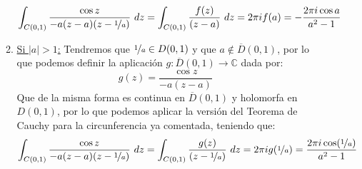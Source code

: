 \begin{ejercicio}
\begin{enumerate}
\begin{description}
\begin{enumerate}
\begin{equation*}
                            \int_{C(0,1)} \dfrac{\cos z}{-a(z-a)(z-\nicefrac{1}{a})}~dz = \int_{C(0,1)} \dfrac{f(z)}{(z-a)}~dz = 2\pi i f(a) = -\dfrac{2\pi i \cos a}{a^2-1}
                        \end{equation*}
                    \item \underline{Si $|a|>1$:} Tendremos que $\nicefrac{1}{a}\in D(0,1)$ y que $a\notin \overline{D}(0,1)$, por lo que podemos definir la aplicación $g:\overline{D}(0,1)\to \mathbb{C}$ dada por:
                        \begin{equation*}
                            g(z) = \dfrac{\cos z}{-a(z-a)}
                        \end{equation*}
                        Que de la misma forma es continua en $\overline{D}(0,1)$ y holomorfa en $D(0,1)$, por lo que podemos aplicar la versión del Teorema de Cauchy para la circunferencia ya comentada, teniendo que:
                        \begin{equation*}
                            \int_{C(0,1)} \dfrac{\cos z}{-a(z-a)(z-\nicefrac{1}{a})}~dz = \int_{C(0,1)} \dfrac{g(z)}{(z-\nicefrac{1}{a})}~dz = 2\pi i g(\nicefrac{1}{a}) = \dfrac{2\pi i \cos(\nicefrac{1}{a})}{a^2-1}
                        \end{equation*}
                \end{enumerate}
        \end{description}

    \end{enumerate}
\end{ejercicio}

